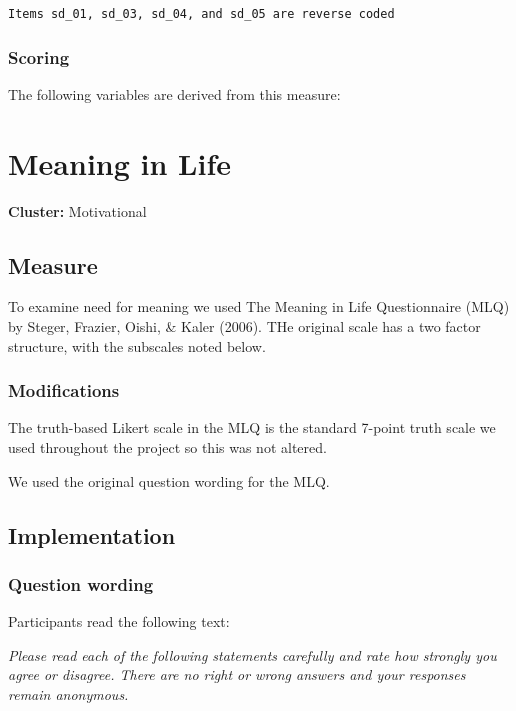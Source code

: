 \documentclass[
  letterpaper,
]{scrbook}
\begin{document}
\texttt{Items\ sd\_01,\ sd\_03,\ sd\_04,\ and\ sd\_05\ are\ reverse\ coded}

\subsection{Scoring}\label{scoring-7}

The following variables are derived from this measure:

\chapter{Meaning in Life}\label{meaning-in-life}

\textbf{Cluster:} Motivational

\section{Measure}\label{measure-8}

To examine need for meaning we used The Meaning in Life Questionnaire
(MLQ) by Steger, Frazier, Oishi, \& Kaler (2006). THe original scale has
a two factor structure, with the subscales noted below.

\subsection*{Modifications}\label{modifications-7}

The truth-based Likert scale in the MLQ is the standard 7-point truth
scale we used throughout the project so this was not altered.

We used the original question wording for the MLQ.

\section{Implementation}\label{implementation-8}

\subsection*{Question wording}\label{question-wording-8}

Participants read the following text:

\emph{Please read each of the following statements carefully and rate
how strongly you agree or disagree. There are no right or wrong answers
and your responses remain anonymous.}
\end{document}
